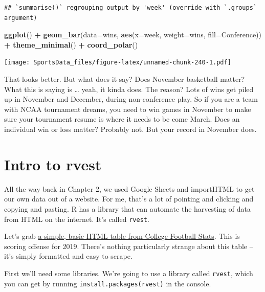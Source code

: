 \documentclass[
]{book}
\newenvironment{Shaded}{\begin{snugshade}}{\end{snugshade}}
\newcommand{\DataTypeTok}[1]{\textcolor[rgb]{0.13,0.29,0.53}{#1}}
\newcommand{\KeywordTok}[1]{\textcolor[rgb]{0.13,0.29,0.53}{\textbf{#1}}}
\newcommand{\NormalTok}[1]{#1}
\newcommand{\OperatorTok}[1]{\textcolor[rgb]{0.81,0.36,0.00}{\textbf{#1}}}
\newcommand{\StringTok}[1]{\textcolor[rgb]{0.31,0.60,0.02}{#1}}
\begin{document}
\begin{verbatim}
## `summarise()` regrouping output by 'week' (override with `.groups` argument)
\end{verbatim}

\begin{Shaded}
\begin{Highlighting}[]
\KeywordTok{ggplot}\NormalTok{() }\OperatorTok{+}\StringTok{ }\KeywordTok{geom_bar}\NormalTok{(}\DataTypeTok{data=}\NormalTok{wins, }\KeywordTok{aes}\NormalTok{(}\DataTypeTok{x=}\NormalTok{week, }\DataTypeTok{weight=}\NormalTok{wins, }\DataTypeTok{fill=}\NormalTok{Conference)) }\OperatorTok{+}\StringTok{ }\KeywordTok{theme_minimal}\NormalTok{() }\OperatorTok{+}\StringTok{ }\KeywordTok{coord_polar}\NormalTok{()}
\end{Highlighting}
\end{Shaded}

\texttt{[image: SportsData\_files/figure-latex/unnamed-chunk-240-1.pdf]}

That looks better. But what does it say? Does November basketball matter? What this is saying is \ldots{} yeah, it kinda does. The reason? Lots of wins get piled up in November and December, during non-conference play. So if you are a team with NCAA tournament dreams, you need to win games in November to make sure your tournament resume is where it needs to be come March. Does an individual win or loss matter? Probably not. But your record in November does.

\hypertarget{intro-to-rvest}{%
\chapter{Intro to rvest}\label{intro-to-rvest}}

All the way back in Chapter 2, we used Google Sheets and importHTML to get our own data out of a website. For me, that's a lot of pointing and clicking and copying and pasting. R has a library that can automate the harvesting of data from HTML on the internet. It's called \texttt{rvest}.

Let's grab \href{http://www.cfbstats.com/2019/leader/national/team/offense/split01/category09/sort01.html}{a simple, basic HTML table from College Football Stats}. This is scoring offense for 2019. There's nothing particularly strange about this table -- it's simply formatted and easy to scrape.

First we'll need some libraries. We're going to use a library called \texttt{rvest}, which you can get by running \texttt{install.packages(\textquotesingle{}rvest\textquotesingle{})} in the console.
\end{document}
